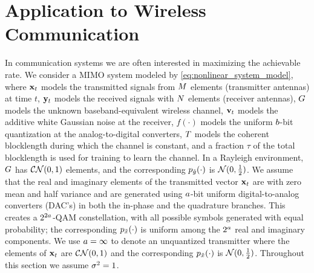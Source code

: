 \documentclass[12pt, draftclsnofoot,journal,onecolumn]{IEEEtran}
\begin{document}
\section{Application to Wireless Communication}
\label{sec:wireless_communication}
In communication systems we are often interested in maximizing the achievable rate. We consider a MIMO system \cite{wen2016bayes,larsson2014massive,lu2014overview,marzetta2016fundamentals,bjornson2019massive} modeled by
 \eqref{eq:nonlinear_system_model}, where ${\mathbf{x}}_t$ models the transmitted signals from $M$ elements (transmitter antennas) at time $t$, ${\mathbf{y}}_t$ models the received signals with $N$ elements (receiver antennas), $G$ models the unknown baseband-equivalent wireless channel, ${\mathbf{v}}_t$ models the additive white Gaussian noise at the receiver, $f(\cdot)$ models the uniform $b$-bit quantization at the analog-to-digital converters, $T$ models the coherent blocklength during which the channel is constant, and a fraction $\tau$ of the total blocklength is used for training to learn the channel. In a Rayleigh environment, $G$ has \iid $\mathcal{C}\mathcal{N}(0,1)$ elements, and the corresponding $p_{\tilde{g}}(\cdot)$ is $\mathcal{N}(0,\frac{1}{2})$.  We assume that the real and imaginary elements of the transmitted vector ${\mathbf{x}}_t$ are \iid with zero mean and half variance and are generated using $a$-bit uniform digital-to-analog converters (DAC's) in both the in-phase and the quadrature branches.  This creates a $2^{2a}$-QAM constellation, with all possible symbols generated with equal probability; the corresponding $p_{\tilde{x}}(\cdot)$ is uniform among the $2^a$ real and imaginary components.  We use $a=\infty$ to denote an unquantized transmitter where the elements of ${\mathbf{x}}_t$ are \iid $\mathcal{C}\mathcal{N}(0,1)$ and the corresponding $p_{\tilde{x}}(\cdot)$ is $\mathcal{N}(0,\frac{1}{2})$.  Throughout this section we assume $\sigma_{}^2=1$.
\end{document}
